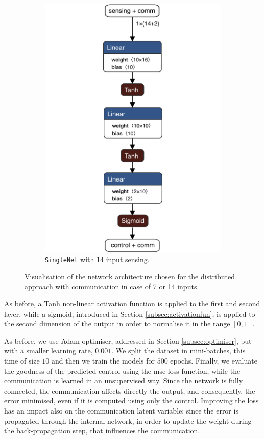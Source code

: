 \begin{figure}[!htb]
\begin{subfigure}[h]{0.495\textwidth}
		\includegraphics[width=.8\textwidth]{contents/images/task1distributed_allcomm@4x}
		\caption{\texttt{SingleNet} with $14$ input sensing.}
	\end{subfigure}
	\caption[Network architectures for the distributed approach with 
	communication.]{Visualisation of the network architecture chosen for the 
		distributed approach with communication in case of 7 or 14 inputs.}
	\label{fig:singlenetcomm1}
\end{figure}

As before, a Tanh non-linear activation function is applied to the first and second 
layer, while a sigmoid, introduced in Section \ref{subsec:activationfun}, is applied 
to the second dimension of the output in order to normalise it in the range $[0, 
1]$.

As before, we use Adam optimiser, addressed in Section \ref{subsec:optimiser}, 
but with a smaller learning rate, $0.001$. 
We split the dataset in mini-batches, this time of size $10$ and then we train 
the models for $500$ epochs. 
Finally, we evaluate the goodness of the predicted control using the \gls{mse} 
loss function, while the communication is learned in an unsupervised way.
Since the network is fully connected, the communication affects directly the 
output, and consequently, the error minimised, even if it is computed using 
only the control. Improving the loss has an impact also on the communication 
latent variable: since the error is propagated through the internal network, in 
order to update the weight during the back-propagation step, that influences the 
communication.

